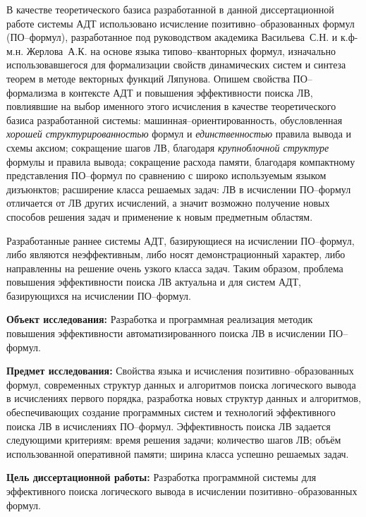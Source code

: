 \documentclass[a4paper]{report}
\begin{document}
В качестве теоретического базиса разработанной в данной диссертационной работе системы АДТ использовано исчисление позитивно--образованных формул (ПО--формул), разработанное под руководством академика Васильева~С.Н. и к.ф-м.н. Жерлова~А.К. на основе языка типово--кванторных формул, изначально использовавшегося для формализации свойств динамических систем и синтеза теорем в методе векторных функций Ляпунова. Опишем свойства ПО--формализма в контексте АДТ и повышения эффективности поиска ЛВ, повлиявшие на выбор именного этого исчисления в качестве теоретического базиса разработанной системы: машинная--ориентированность, обусловленная \emph{хорошей структурированностью} формул и \emph{единственностью} правила вывода и схемы аксиом; сокращение шагов ЛВ, благодаря \emph{крупноблочной структуре} формулы и правила вывода; сокращение расхода памяти, благодаря компактному представления ПО--формул по сравнению с широко используемым языком дизъюнктов; расширение класса решаемых задач: ЛВ в исчислении ПО--формул отличается от ЛВ других исчислений, а значит возможно получение новых способов решения задач и применение к новым предметным областям.

Разработанные раннее системы АДТ, базирующиеся на исчислении ПО--формул, либо являются неэффективным, либо носят демонстрационный характер, либо направленны на решение очень узкого класса задач. Таким образом, проблема повышения эффективности поиска ЛВ актуальна и для систем АДТ, базирующихся на исчислении ПО--формул.

\textbf{Объект исследования:}
Разработка и программная реализация методик повышения эффективности автоматизированного поиска ЛВ в исчислении ПО--формул.

\textbf{Предмет исследования:}
Свойства языка и исчисления позитивно--образованных формул, современных структур данных и алгоритмов поиска логического вывода в исчислениях первого порядка, разработка новых структур данных и алгоритмов, обеспечивающих создание программных систем и технологий эффективного поиска ЛВ в исчислениях ПО--формул. Эффективность поиска ЛВ задается следующими критериям: время решения задачи; количество шагов ЛВ; объём использованной оперативной памяти; ширина класса успешно решаемых задач.

\textbf{Цель диссертационной работы:}
Разработка программной системы для эффективного поиска логического вывода в исчислении позитивно--образованных формул.
\end{document}
